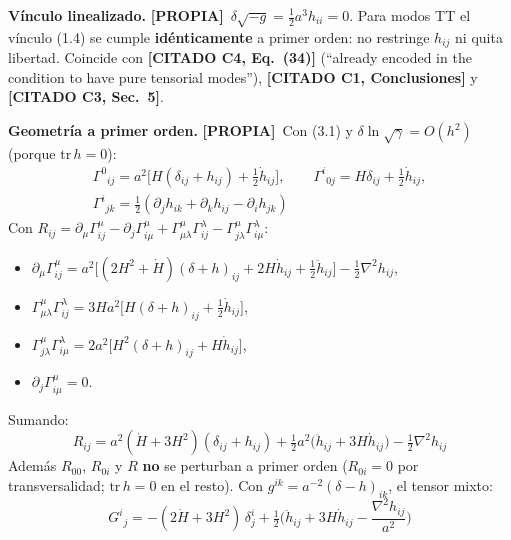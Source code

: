 \documentclass[11pt,a4paper]{article}
\newcommand{\propia}{{\bfseries\color{TealBlue}[PROPIA]}}
\newcommand{\citado}[1]{{\bfseries\color{RoyalBlue}[CITADO #1]}}
\newcommand{\sub}[2]{\par\medskip\noindent{\bfseries\color{NavyBlue}#1}\quad\textbf{#2}}
\begin{document}
\sub{3.3}{Vínculo linealizado.} \propia\ $\delta\sqrt{-g}=\tfrac12a^3h_{ii}=0$. Para modos TT el vínculo (1.4) se cumple \textbf{idénticamente} a primer orden: no restringe $h_{ij}$ ni quita libertad. Coincide con \citado{C4, Eq.~(34)} (``already encoded in the condition to have pure tensorial modes''), \citado{C1, Conclusiones} y \citado{C3, Sec.~5}.

\sub{3.4}{Geometría a primer orden.} \propia\ Con (3.1) y $\delta\ln\sqrt\gamma=O(h^2)$ (porque $\mathrm{tr}\,h=0$):
\begin{equation}
\begin{gathered}
\Gamma^0{}_{ij}=a^2\Big[H(\delta_{ij}+h_{ij})+\tfrac12\dot h_{ij}\Big],\qquad
\Gamma^i{}_{0j}=H\delta_{ij}+\tfrac12\dot h_{ij},\\
\Gamma^i{}_{jk}=\tfrac12(\partial_jh_{ik}+\partial_kh_{ij}-\partial_ih_{jk})
\end{gathered}\tag{3.3}
\end{equation}
Con $R_{ij}=\partial_\mu\Gamma^\mu_{ij}-\partial_j\Gamma^\mu_{i\mu}+\Gamma^\mu_{\mu\lambda}\Gamma^\lambda_{ij}-\Gamma^\mu_{j\lambda}\Gamma^\lambda_{i\mu}$:
\begin{itemize}[nosep]
\item $\partial_\mu\Gamma^\mu_{ij}=a^2\big[(2H^2+\dot H)(\delta+h)_{ij}+2H\dot h_{ij}+\tfrac12\ddot h_{ij}\big]-\tfrac12\nabla^2h_{ij}$,
\item $\Gamma^\mu_{\mu\lambda}\Gamma^\lambda_{ij}=3Ha^2\big[H(\delta+h)_{ij}+\tfrac12\dot h_{ij}\big]$,
\item $\Gamma^\mu_{j\lambda}\Gamma^\lambda_{i\mu}=2a^2\big[H^2(\delta+h)_{ij}+H\dot h_{ij}\big]$,
\item $\partial_j\Gamma^\mu_{i\mu}=0$.
\end{itemize}
Sumando:
\begin{equation}
R_{ij}=a^2(\dot H+3H^2)(\delta_{ij}+h_{ij})+\tfrac12a^2\big(\ddot h_{ij}+3H\dot h_{ij}\big)-\tfrac12\nabla^2h_{ij}\tag{3.4}
\end{equation}
Además $R_{00}$, $R_{0i}$ y $R$ \textbf{no} se perturban a primer orden ($R_{0i}=0$ por transversalidad; $\mathrm{tr}\,h=0$ en el resto). Con $g^{ik}=a^{-2}(\delta-h)_{ik}$, el tensor mixto:
\begin{equation}
G^i{}_j=-(2\dot H+3H^2)\,\delta^i_j+\tfrac12\Big(\ddot h_{ij}+3H\dot h_{ij}-\frac{\nabla^2h_{ij}}{a^2}\Big)\tag{3.5}
\end{equation}
\end{document}
